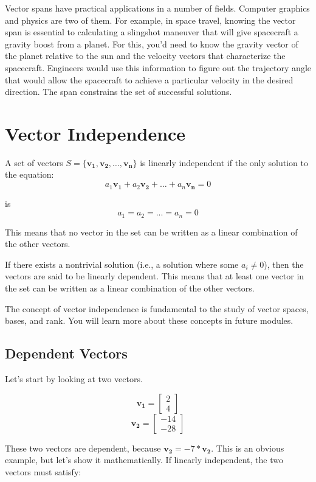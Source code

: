 Vector spans have practical applications in a number of fields. Computer 
graphics and physics are two of them. For example, in space travel, knowing 
the vector span is essential to calculating a slingshot maneuver that will 
give spacecraft a gravity boost from a planet. For this, you'd need to know 
the gravity vector of the planet relative to the sun and the velocity vectors 
that characterize the spacecraft. Engineers would use this information to 
figure out the trajectory angle that would allow the spacecraft to achieve a 
particular velocity in the desired direction. The span constrains the set of 
successful solutions.

\section{Vector Independence}
A set of vectors $S = \{\mathbf{v_1}, \mathbf{v_2}, \dots, \mathbf{v_n}\}$ is 
linearly independent if the only solution to the equation:
$$a_1 \mathbf{v_1} + a_2 \mathbf{v_2} + \dots + a_n \mathbf{v_n} = 0$$

is 
$$a_1 = a_2 = ... = a_n = 0$$ 

This means that no vector in the set can be written as a linear combination of 
the other vectors.

If there exists a nontrivial solution (i.e., a solution where some $a_i \neq 
0$), then the vectors are said to be linearly dependent. This means that at 
least one vector in the set can be written as a linear combination of the 
other vectors.

The concept of vector independence is fundamental to the study of vector 
spaces, bases, and rank. You will learn more about these concepts in future 
modules. 

\subsection{Dependent Vectors}
Let's start by looking at two vectors. 

$$\mathbf{v_1} = \begin{bmatrix}
			2 \\
			4
		\end{bmatrix}$$
$$\mathbf{v_2} = \begin{bmatrix}
			-14 \\
			-28
\end{bmatrix}$$

These two vectors are dependent, because $\mathbf{v_2} = -7*\mathbf{v_2}$. This is an obvious example, but let's show it mathematically. If linearly independent, the two vectors must satisfy:

